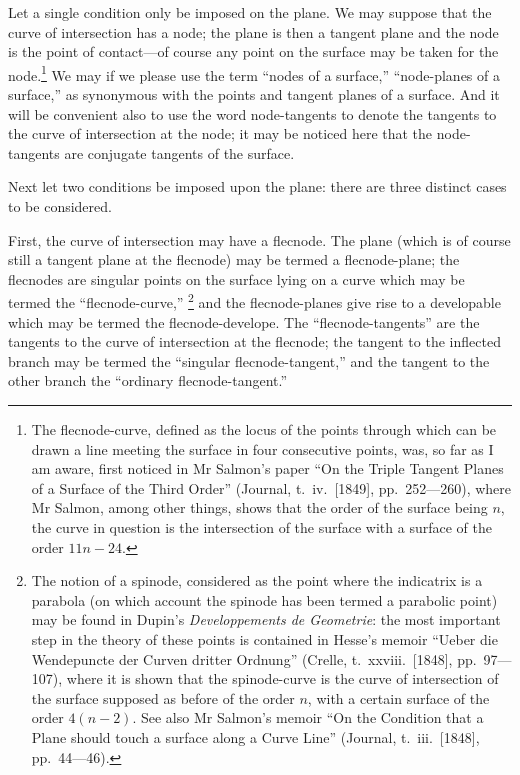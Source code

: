 \documentclass[11pt,a4paper]{article}
\theoremstyle{plain}
\begin{document}
Let a single condition only be imposed on the plane. We may suppose that the curve of intersection has a node; the plane is then a tangent plane and the node is the point of contact---of course any point on the surface may be taken for the node.\footnote{The flecnode-curve, defined as the locus of the points through which can be drawn a line meeting the surface in four consecutive points, was, so far as I am aware, first noticed in Mr Salmon's paper ``On the Triple Tangent Planes of a Surface of the Third Order'' (Journal, t.\ iv.\ [1849], pp.\ 252---260), where Mr Salmon, among other things, shows that the order of the surface being $n$, the curve in question is the intersection of the surface with a surface of the order $11n - 24$.} We may if we please use the term ``nodes of a surface,'' ``node-planes of a surface,'' as synonymous with the points and tangent planes of a surface. And it will be convenient also to use the word node-tangents to denote the tangents to the curve of intersection at the node; it may be noticed here that the node-tangents are conjugate tangents of the surface.

Next let two conditions be imposed upon the plane: there are three distinct cases to be considered.

First, the curve of intersection may have a flecnode. The plane (which is of course still a tangent plane at the flecnode) may be termed a flecnode-plane; the flecnodes are singular points on the surface lying on a curve which may be termed the ``flecnode-curve,''
\footnote{The notion of a spinode, considered as the point where the indicatrix is a parabola (on which account the spinode has been termed a parabolic point) may be found in Dupin's \textit{Developpements de Geometrie}: the most important step in the theory of these points is contained in Hesse's memoir ``Ueber die Wendepuncte der Curven dritter Ordnung'' (Crelle, t.\ xxviii.\ [1848], pp.\ 97---107), where it is shown that the spinode-curve is the curve of intersection of the surface supposed as before of the order $n$, with a certain surface of the order $4(n-2)$. See also Mr Salmon's memoir ``On the Condition that a Plane should touch a surface along a Curve Line'' (Journal, t.\ iii.\ [1848], pp.\ 44---46).}
and the flecnode-planes give rise to a developable which may be termed the flecnode-develope. The ``flecnode-tangents'' are the tangents to the curve of intersection at the flecnode; the tangent to the inflected branch may be termed the ``singular flecnode-tangent,'' and the tangent to the other branch the ``ordinary flecnode-tangent.''
\end{document}
